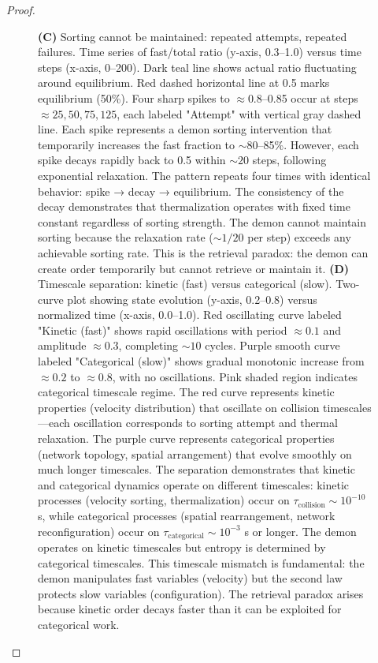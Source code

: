 \documentclass[12pt,a4paper]{article}
\theoremstyle{definition}
\theoremstyle{remark}
\begin{document}
\begin{proof}
\begin{figure}[htbp]
{\textbf{(C)} Sorting cannot be maintained: repeated attempts, repeated failures. Time series of fast/total ratio (y-axis, 0.3–1.0) versus time steps (x-axis, 0–200). Dark teal line shows actual ratio fluctuating around equilibrium. Red dashed horizontal line at 0.5 marks equilibrium (50\%). Four sharp spikes to $\approx 0.8$–0.85 occur at steps $\approx 25, 50, 75, 125$, each labeled "Attempt" with vertical gray dashed line. Each spike represents a demon sorting intervention that temporarily increases the fast fraction to $\sim 80$–85\%. However, each spike decays rapidly back to 0.5 within $\sim 20$ steps, following exponential relaxation. The pattern repeats four times with identical behavior: spike → decay → equilibrium. The consistency of the decay demonstrates that thermalization operates with fixed time constant regardless of sorting strength. The demon cannot maintain sorting because the relaxation rate ($\sim 1/20$ per step) exceeds any achievable sorting rate. This is the retrieval paradox: the demon can create order temporarily but cannot retrieve or maintain it.
\textbf{(D)} Timescale separation: kinetic (fast) versus categorical (slow). Two-curve plot showing state evolution (y-axis, 0.2–0.8) versus normalized time (x-axis, 0.0–1.0). Red oscillating curve labeled "Kinetic (fast)" shows rapid oscillations with period $\approx 0.1$ and amplitude $\approx 0.3$, completing $\sim 10$ cycles. Purple smooth curve labeled "Categorical (slow)" shows gradual monotonic increase from $\approx 0.2$ to $\approx 0.8$, with no oscillations. Pink shaded region indicates categorical timescale regime. The red curve represents kinetic properties (velocity distribution) that oscillate on collision timescales—each oscillation corresponds to sorting attempt and thermal relaxation. The purple curve represents categorical properties (network topology, spatial arrangement) that evolve smoothly on much longer timescales. The separation demonstrates that kinetic and categorical dynamics operate on different timescales: kinetic processes (velocity sorting, thermalization) occur on $\tau_{\text{collision}} \sim 10^{-10}$ s, while categorical processes (spatial rearrangement, network reconfiguration) occur on $\tau_{\text{categorical}} \sim 10^{-3}$ s or longer. The demon operates on kinetic timescales but entropy is determined by categorical timescales. This timescale mismatch is fundamental: the demon manipulates fast variables (velocity) but the second law protects slow variables (configuration). The retrieval paradox arises because kinetic order decays faster than it can be exploited for categorical work.}
\label{fig:arg3_retrieval_paradox_v2}
\end{figure}



\end{proof}
\end{document}
